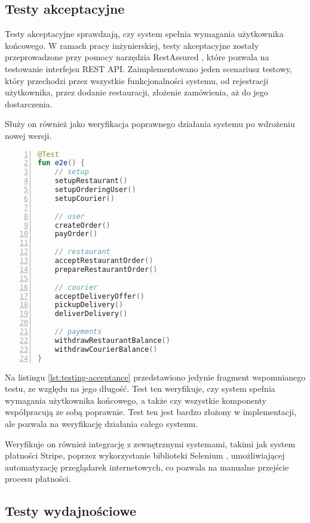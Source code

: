 \subsection{Testy akceptacyjne}

Testy akceptacyjne sprawdzają, czy system spełnia wymagania użytkownika końcowego. W ramach pracy inżynierskiej, testy akceptacyjne zostały przeprowadzone przy pomocy narzędzia RestAssured \cite{restassured}, które pozwala na testowanie interfejsu REST API. Zaimplementowano jeden scenariusz testowy, który przechodzi przez wszystkie funkcjonalności systemu, od rejestracji użytkownika, przez dodanie restauracji, złożenie zamówienia, aż do jego dostarczenia.

Służy on również jako weryfikacja poprawnego działania systemu po wdrożeniu nowej wersji.

\begin{lstlisting}[caption={Scenariusz testowy w ramach testów akceptacyjnych},label={lst:testing-acceptance},captionpos=b,language=Kotlin,numbers=left]
@Test
fun e2e() {
    // setup
    setupRestaurant()
    setupOrderingUser()
    setupCourier()

    // user
    createOrder()
    payOrder()

    // restaurant
    acceptRestaurantOrder()
    prepareRestaurantOrder()

    // courier
    acceptDeliveryOffer()
    pickupDelivery()
    deliverDelivery()

    // payments
    withdrawRestaurantBalance()
    withdrawCourierBalance()
}
\end{lstlisting}

Na listingu \ref{lst:testing-acceptance} przedstawiono jedynie fragment wspomnianego testu, ze względu na jego długość. Test ten weryfikuje, czy system spełnia wymagania użytkownika końcowego, a także czy wszystkie komponenty współpracują ze sobą poprawnie. Test ten jest bardzo złożony w implementacji, ale pozwala na weryfikację działania całego systemu.

Weryfikuje on również integrację z zewnętrznymi systemami, takimi jak system płatności Stripe, poprzez wykorzystanie biblioteki Selenium \cite{selenium}, umożliwiającej automatyzację przeglądarek internetowych, co pozwala na manualne przejście procesu płatności.

\subsection{Testy wydajnościowe}

